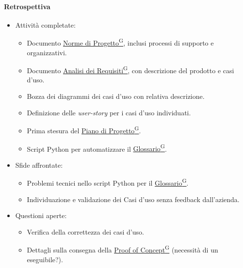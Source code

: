\documentclass{article}
\begin{document}
                \paragraph{Retrospettiva}
                    \begin{itemize}
                        \item Attività completate:
                        \begin{itemize}
                            \item Documento \href{https://code7crusaders.github.io/docs/PB/documentazione_interna/glossario.html#norme-di-progetto}{Norme di Progetto\textsuperscript{G}}, inclusi processi di supporto e organizzativi.
                            \item Documento \href{https://code7crusaders.github.io/docs/PB/documentazione_interna/glossario.html#analisi-dei-requisiti}{Analisi dei Requisiti\textsuperscript{G}}, con descrizione del prodotto e casi d'uso.
                            \item Bozza dei diagrammi dei casi d'uso con relativa descrizione.
                            \item Definizione delle \textit{user-story} per i casi d'uso individuati.
                            \item Prima stesura del \href{https://code7crusaders.github.io/docs/PB/documentazione_interna/glossario.html#piano-di-progetto}{Piano di Progetto\textsuperscript{G}}.
                            \item Script Python per automatizzare il \href{https://code7crusaders.github.io/docs/PB/documentazione_interna/glossario.html#glossario}{Glossario\textsuperscript{G}}.
                        \end{itemize}
                        \item Sfide affrontate:
                        \begin{itemize}
                            \item Problemi tecnici nello script Python per il \href{https://code7crusaders.github.io/docs/PB/documentazione_interna/glossario.html#glossario}{Glossario\textsuperscript{G}}.
                            \item Individuazione e validazione dei Casi d'uso senza feedback dall'azienda.
                        \end{itemize}
                        \item Questioni aperte:
                        \begin{itemize}
                            \item Verifica della correttezza dei casi d'uso.
                            \item Dettagli sulla consegna della \href{https://code7crusaders.github.io/docs/PB/documentazione_interna/glossario.html#poc-proof-of-concept}{Proof of Concept\textsuperscript{G}} (necessità di un eseguibile?).
                        \end{itemize}
                    \end{itemize}
\end{document}
